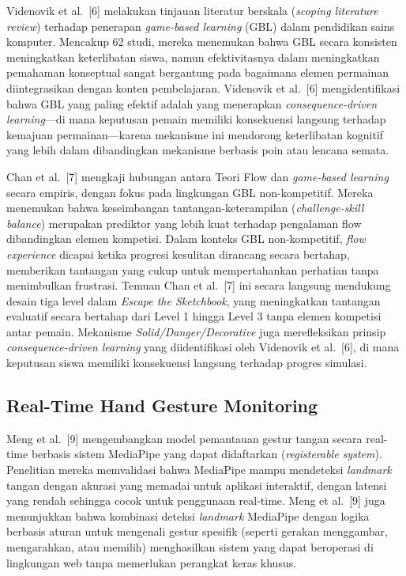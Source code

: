 \documentclass[12pt,oneside]{report}
\begin{document}
Videnovik et al.\ [6] melakukan tinjauan literatur berskala (\textit{scoping literature review}) terhadap penerapan \textit{game-based learning} (GBL) dalam pendidikan sains komputer. Mencakup 62 studi, mereka menemukan bahwa GBL secara konsisten meningkatkan keterlibatan siswa, namun efektivitasnya dalam meningkatkan pemahaman konseptual sangat bergantung pada bagaimana elemen permainan diintegrasikan dengan konten pembelajaran. Videnovik et al.\ [6] mengidentifikasi bahwa GBL yang paling efektif adalah yang menerapkan \textit{consequence-driven learning}---di mana keputusan pemain memiliki konsekuensi langsung terhadap kemajuan permainan---karena mekanisme ini mendorong keterlibatan kognitif yang lebih dalam dibandingkan mekanisme berbasis poin atau lencana semata.

Chan et al.\ [7] mengkaji hubungan antara Teori Flow dan \textit{game-based learning} secara empiris, dengan fokus pada lingkungan GBL non-kompetitif. Mereka menemukan bahwa keseimbangan tantangan-keterampilan (\textit{challenge-skill balance}) merupakan prediktor yang lebih kuat terhadap pengalaman flow dibandingkan elemen kompetisi. Dalam konteks GBL non-kompetitif, \textit{flow experience} dicapai ketika progresi kesulitan dirancang secara bertahap, memberikan tantangan yang cukup untuk mempertahankan perhatian tanpa menimbulkan frustrasi. Temuan Chan et al.\ [7] ini secara langsung mendukung desain tiga level dalam \textit{Escape the Sketchbook}, yang meningkatkan tantangan evaluatif secara bertahap dari Level 1 hingga Level 3 tanpa elemen kompetisi antar pemain. Mekanisme \textit{Solid/Danger/Decorative} juga merefleksikan prinsip \textit{consequence-driven learning} yang diidentifikasi oleh Videnovik et al.\ [6], di mana keputusan siswa memiliki konsekuensi langsung terhadap progres simulasi.

\subsection{Real-Time Hand Gesture Monitoring}
\label{subsec:penelitian-hand-gesture}

Meng et al.\ [9] mengembangkan model pemantauan gestur tangan secara real-time berbasis sistem MediaPipe yang dapat didaftarkan (\textit{registerable system}). Penelitian mereka memvalidasi bahwa MediaPipe mampu mendeteksi \textit{landmark} tangan dengan akurasi yang memadai untuk aplikasi interaktif, dengan latensi yang rendah sehingga cocok untuk penggunaan real-time. Meng et al.\ [9] juga menunjukkan bahwa kombinasi deteksi \textit{landmark} MediaPipe dengan logika berbasis aturan untuk mengenali gestur spesifik (seperti gerakan menggambar, mengarahkan, atau memilih) menghasilkan sistem yang dapat beroperasi di lingkungan web tanpa memerlukan perangkat keras khusus.
\end{document}
